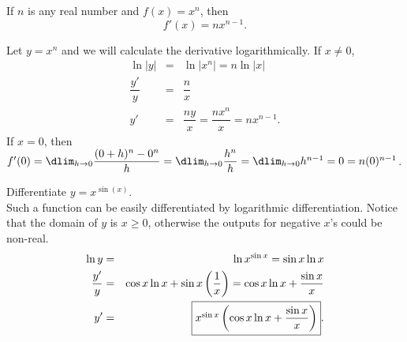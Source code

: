 \documentclass{book}
\begin{document}
\begin{Thm} If $n$ is any real number and $f(x) = x^n$, then \[f'(x) = nx^{n-1}.\]\end{Thm}
\begin{pf} Let $y = x^n$ and we will calculate the derivative logarithmically. If $x\neq 0$,
\begin{eqnarray*}
\ln |y| &=& \ln |x^n| = n\ln |x|\\
\dfrac{y'}{y} &=& \dfrac{n}{x}\\
y' &=& \dfrac{ny}{x} = \dfrac{nx^n}{x}  = nx^{n-1}.
\end{eqnarray*}
If $x = 0$, then $f'(0) = \dlim_{h\to 0} \dfrac{(0+h)^n - 0^n}{h} = \dlim_{h\to 0}\dfrac{h^n}{h} = \dlim_{h\to 0} h^{n-1} = 0 = n(0)^{n-1}$. 
\end{pf}\vs

\begin{Exam} Differentiate $y = x^{\sin(x)}$.\\

Such a function can be easily differentiated by logarithmic differentiation. Notice that the domain of $y$ is $x\ge 0$, otherwise the outputs for negative $x$'s could be non-real. 
\begin{eqnarray*}
\ln y &=& \ln x^{\sin x}  = \sin x\ln x\\
\dfrac{y'}{y} &=& \cos x\ln x + \sin x\left(\dfrac{1}{x}\right) =\cos x\ln x + \dfrac{\sin x}{x}\\
y' &=& \fbox{$x^{\sin x}\left(\cos x \ln x + \dfrac{\sin x}{x}\right)$}.
\end{eqnarray*}
\end{Exam}\vs



\vfill
{}
\pagebreak
\end{document}
